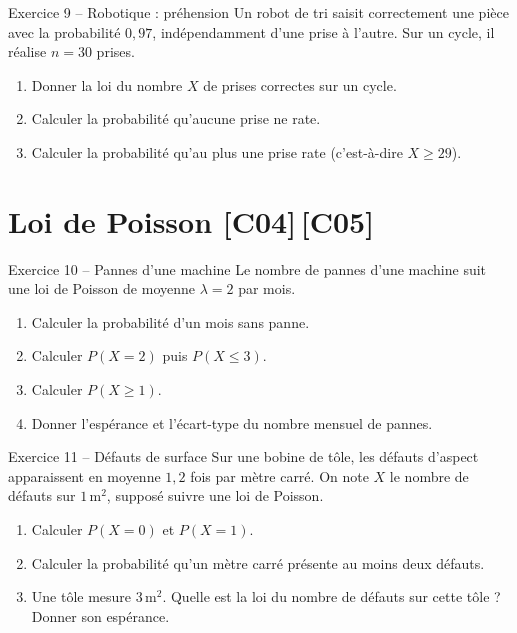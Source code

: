 \documentclass[a4paper,11pt]{article}
\begin{document}
\begin{exo}{Exercice 9 -- Robotique : préhension}
Un robot de tri saisit correctement une pièce avec la probabilité $0{,}97$, indépendamment d'une prise à l'autre. Sur un cycle, il réalise $n = 30$ prises.
\begin{enumerate}[label=\alph*)]
  \item Donner la loi du nombre $X$ de prises correctes sur un cycle.
  \item Calculer la probabilité qu'aucune prise ne rate.
  \item Calculer la probabilité qu'au plus une prise rate (c'est-à-dire $X \geq 29$).
\end{enumerate}
\end{exo}

\section{Loi de Poisson \hfill {\normalsize\color{uimmred}[C04]\,[C05]}}

\begin{exo}{Exercice 10 -- Pannes d'une machine}
Le nombre de pannes d'une machine suit une loi de Poisson de moyenne $\lambda = 2$ par mois.
\begin{enumerate}[label=\alph*)]
  \item Calculer la probabilité d'un mois sans panne.
  \item Calculer $P(X = 2)$ puis $P(X \leq 3)$.
  \item Calculer $P(X \geq 1)$.
  \item Donner l'espérance et l'écart-type du nombre mensuel de pannes.
\end{enumerate}
\end{exo}

\begin{exo}{Exercice 11 -- Défauts de surface}
Sur une bobine de tôle, les défauts d'aspect apparaissent en moyenne $1{,}2$ fois par mètre carré. On note $X$ le nombre de défauts sur $1\,\text{m}^2$, supposé suivre une loi de Poisson.
\begin{enumerate}[label=\alph*)]
  \item Calculer $P(X = 0)$ et $P(X = 1)$.
  \item Calculer la probabilité qu'un mètre carré présente au moins deux défauts.
  \item Une tôle mesure $3\,\text{m}^2$. Quelle est la loi du nombre de défauts sur cette tôle ? Donner son espérance.
\end{enumerate}
\end{exo}
\end{document}
